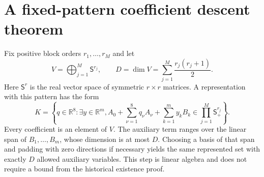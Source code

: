 \documentclass[11pt]{article}
\newcommand{\R}{\mathbb R}
\begin{document}
\section{A fixed-pattern coefficient descent theorem}
Fix positive block orders $r_1,\ldots,r_M$ and let
\[
 V=\bigoplus_{j=1}^{M}\mathsf S^{r_j},\qquad
 D=\dim V=\sum_{j=1}^{M}\frac{r_j(r_j+1)}2.
\]
Here $\mathsf S^r$ is the real vector space of symmetric $r\times r$ matrices. A representation with this pattern has the form
\begin{equation}\label{eq:generic-lift}
 K=\left\{q\in\R^8:\exists y\in\R^m,
 A_0+\sum_{\nu=1}^{8}q_\nu A_\nu
       +\sum_{k=1}^{m}y_kB_k\in\prod_{j=1}^{M}\mathsf S^{r_j}_+\right\}.
\end{equation}
Every coefficient is an element of $V$. The auxiliary term ranges over the linear span of $B_1,\ldots,B_m$, whose dimension is at most $D$. Choosing a basis of that span and padding with zero directions if necessary yields the same represented set with exactly $D$ allowed auxiliary variables. This step is linear algebra and does not require a bound from the historical existence proof.
\end{document}
